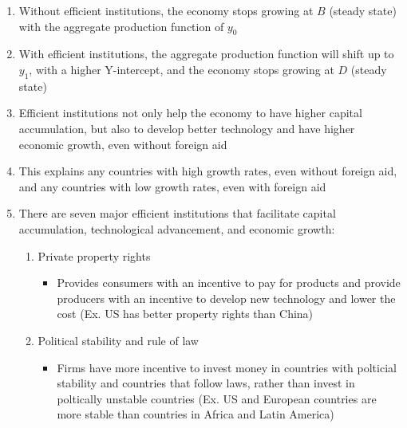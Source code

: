 \documentclass[12pt]{article}
\begin{document}
\begin{enumerate}
\begin{enumerate}
\begin{enumerate}
              \item Without efficient institutions, the economy stops growing at $B$ (steady state) with the aggregate production function of $y_0$

              \item With efficient institutions, the aggregate production function will shift up to $y_1$, with a higher Y-intercept, and the economy stops growing at $D$ (steady state)

              \item Efficient institutions not only help the economy to have higher capital accumulation, but also to develop better technology and have higher economic growth, even without foreign aid

              \item This explains any countries with high growth rates, even without foreign aid, and any countries with low growth rates, even with foreign aid

              \item There are seven major efficient institutions that facilitate capital accumulation, technological advancement, and economic growth:

                \begin{enumerate}

                  \item Private property rights

                    \begin{itemize}

                      \item Provides consumers with an incentive to pay for products and provide producers with an incentive to develop new technology and lower the cost (Ex. US has better property rights than China)

                    \end{itemize}

                  \item Political stability and rule of law

                    \begin{itemize}

                      \item Firms have more incentive to invest money in countries with polticial stability and countries that follow laws, rather than invest in poltically unstable countries (Ex. US and European countries are more stable than countries in Africa and Latin America)


\end{itemize}
\end{enumerate}
\end{enumerate}
\end{enumerate}
\end{enumerate}
\end{document}
